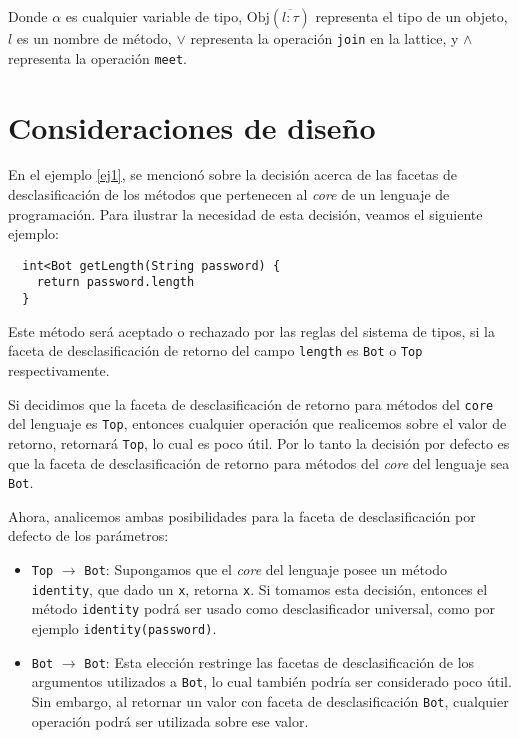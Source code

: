 Donde $\alpha$ es cualquier variable de tipo, $\text{Obj}(\overline{l: \tau})$ representa el tipo de un objeto, $l$ es un nombre de método, $\vee$ representa la operación \texttt{join} en la lattice, y $\wedge$ representa la operación \texttt{meet}.

\section{Consideraciones de diseño}

En el ejemplo \ref{ej1}, se mencionó sobre la decisión acerca de las facetas de desclasificación de los métodos que pertenecen al \textit{core} de un lenguaje de programación. Para ilustrar la necesidad de esta decisión, veamos el siguiente ejemplo:

\begin{lstlisting}
  int<Bot getLength(String password) {
    return password.length
  }
\end{lstlisting}

Este método será aceptado o rechazado por las reglas del sistema de tipos, si la faceta de desclasificación de retorno del campo \texttt{length} es \texttt{Bot} o \texttt{Top} respectivamente.

Si decidimos que la faceta de desclasificación de retorno para métodos del \texttt{core} del lenguaje es \texttt{Top}, entonces cualquier operación que realicemos sobre el valor de retorno, retornará \texttt{Top}, lo cual es poco útil. Por lo tanto la decisión por defecto es que la faceta de desclasificación de retorno para métodos del \textit{core} del lenguaje sea \texttt{Bot}.

Ahora, analicemos ambas posibilidades para la faceta de desclasificación por defecto de los parámetros:

\begin{itemize}
  \item \texttt{Top} $\rightarrow$ \texttt{Bot}: Supongamos que el \textit{core} del lenguaje posee un método \texttt{identity}, que dado un \texttt{x}, retorna \texttt{x}. Si tomamos esta decisión, entonces el método \texttt{identity} podrá ser usado como desclasificador universal, como por ejemplo \texttt{identity(password)}.
  \item \texttt{Bot} $\rightarrow$ \texttt{Bot}: Esta elección restringe las facetas de desclasificación de los argumentos utilizados a \texttt{Bot}, lo cual también podría ser considerado poco útil. Sin embargo, al retornar un valor con faceta de desclasificación \texttt{Bot}, cualquier operación podrá ser utilizada sobre ese valor.
\end{itemize}

